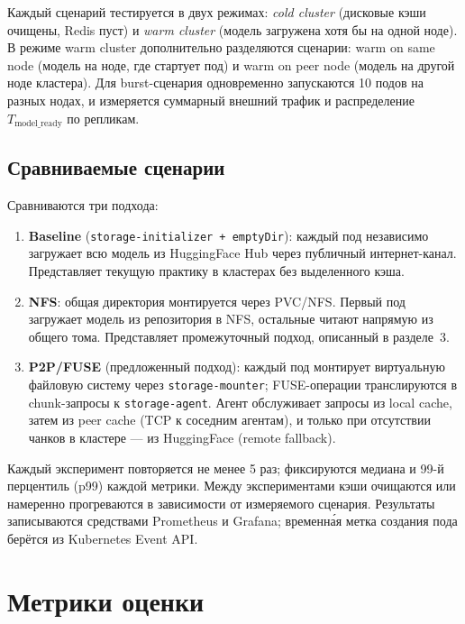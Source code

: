 Каждый сценарий тестируется в двух режимах: \textit{cold cluster} (дисковые кэши очищены, Redis пуст) и \textit{warm cluster} (модель загружена хотя бы на одной ноде). В режиме warm cluster дополнительно разделяются сценарии: warm on same node (модель на ноде, где стартует под) и warm on peer node (модель на другой ноде кластера). Для burst-сценария одновременно запускаются 10 подов на разных нодах, и измеряется суммарный внешний трафик и распределение $T_{\mathrm{model\_ready}}$ по репликам.

\subsection*{Сравниваемые сценарии}

Сравниваются три подхода:

\begin{enumerate}[leftmargin=*]
  \item \textbf{Baseline} (\texttt{storage-initializer + emptyDir}): каждый под независимо загружает всю модель из HuggingFace Hub через публичный интернет-канал. Представляет текущую практику в кластерах без выделенного кэша.

  \item \textbf{NFS}: общая директория монтируется через PVC/NFS. Первый под загружает модель из репозитория в NFS, остальные читают напрямую из общего тома. Представляет промежуточный подход, описанный в разделе~3.

  \item \textbf{P2P/FUSE} (предложенный подход): каждый под монтирует виртуальную файловую систему через \texttt{storage-mounter}; FUSE-операции транслируются в chunk-запросы к \texttt{storage-agent}. Агент обслуживает запросы из local cache, затем из peer cache (TCP к соседним агентам), и только при отсутствии чанков в кластере --- из HuggingFace (remote fallback).
\end{enumerate}

Каждый эксперимент повторяется не менее 5 раз; фиксируются медиана и 99-й перцентиль (p99) каждой метрики. Между экспериментами кэши очищаются или намеренно прогреваются в зависимости от измеряемого сценария. Результаты записываются средствами Prometheus и Grafana; временна́я метка создания пода берётся из Kubernetes Event API.

\section{Метрики оценки}

